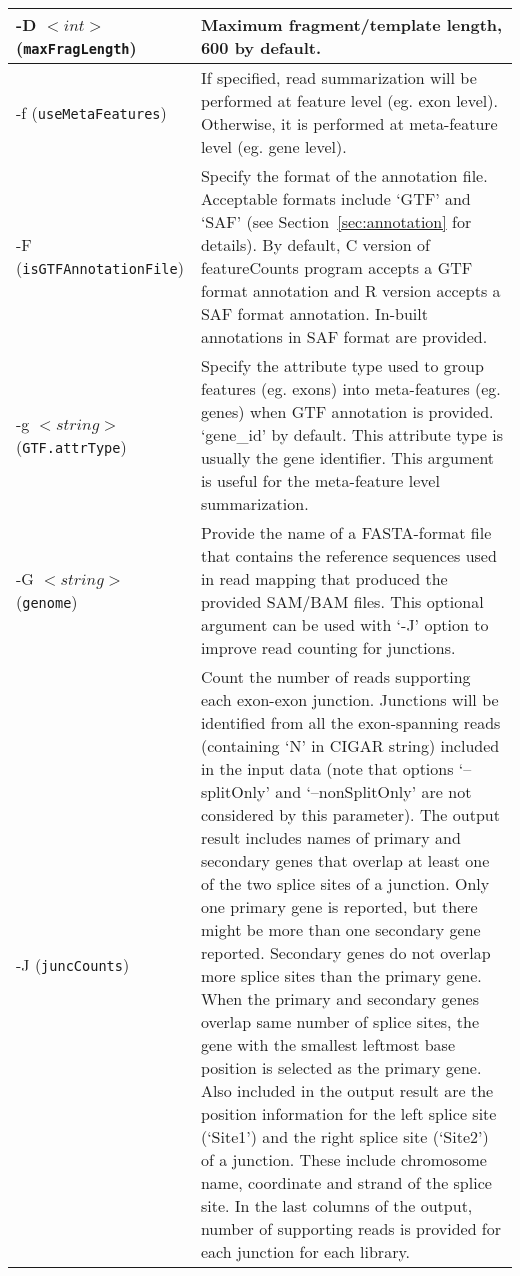 \documentclass[12pt]{report}
\newcommand{\code}[1]{{\small\texttt{#1}}}
\newcommand{\featureCounts}{\textsf{featureCounts}}
\newcommand{\C}{\textsf{C}}
\begin{document}
\begin{longtable}{|p{5cm}|p{11cm}|}
\hline
-D $<int>$ \newline (\code{maxFragLength}) & Maximum fragment/template length, 600 by default.\\
\hline
-f \newline (\code{useMetaFeatures}) & If specified, read summarization will be performed at feature level (eg. exon level). Otherwise, it is performed at meta-feature level (eg. gene level).\\
\hline
-F \newline (\code{isGTFAnnotationFile}) & Specify the format of the annotation file. Acceptable formats include `GTF' and `SAF' (see Section~\ref{sec:annotation} for details). By default, {\C} version of {\featureCounts} program accepts a GTF format annotation and R version accepts a SAF format annotation. In-built annotations in SAF format are provided.\\
\hline
-g $<string>$ \newline (\code{GTF.attrType}) & Specify the attribute type used to group features (eg. exons) into meta-features (eg. genes) when GTF annotation is provided. `gene\_id' by default. This attribute type is usually the gene identifier. This argument is useful for the meta-feature level summarization.\\
\hline
-G $<string>$ \newline (\code{genome}) & Provide the name of a FASTA-format file that contains the reference sequences used in
read mapping that produced the provided SAM/BAM files. This optional argument can be used with `-J' option to improve read counting for junctions.\\
\hline
-J \newline (\code{juncCounts}) & Count the number of reads supporting each exon-exon junction. Junctions will be identified from all the exon-spanning reads (containing `N' in CIGAR string) included in the input data (note that options `--splitOnly' and `--nonSplitOnly' are not considered by this parameter). The output result includes names of primary and secondary genes that overlap at least one of the two splice sites of a junction. Only one primary gene is reported, but there might be more than one secondary gene reported. Secondary genes do not overlap more splice sites than the primary gene. When the primary and secondary genes overlap same number of splice sites, the gene with the smallest leftmost base position is selected as the primary gene. Also included in the output result are the position information for the left splice site (`Site1') and the right splice site (`Site2') of a junction. These include chromosome name, coordinate and strand of the splice site. In the last columns of the output, number of supporting reads is provided for each junction for each library.\\

\end{longtable}
\end{document}
